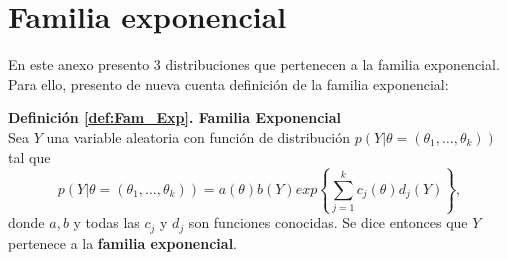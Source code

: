 \chapter{Familia exponencial}

En este anexo presento 3 distribuciones que pertenecen a la familia exponencial. Para ello, presento de nueva cuenta definición de la familia exponencial: 

\textbf{Definición \ref{def:Fam_Exp}. Familia Exponencial}\\
Sea $Y$ una variable aleatoria con función de distribución $p\left(Y|\theta = (\theta_1,\dots,\theta_k)\right)$ tal que 
\begin{equation*}
p\left(Y|\theta = (\theta_1,\dots,\theta_k)\right) = a(\theta)b(Y)exp\left\lbrace\sum\limits_{j=1}^k c_j(\theta)d_j(Y)\right\rbrace,
\end{equation*}
donde $a, b$ y todas las $c_j$ y $d_j$ son funciones conocidas. Se dice entonces que $Y$ pertenece a la \textbf{familia exponencial}.
 

